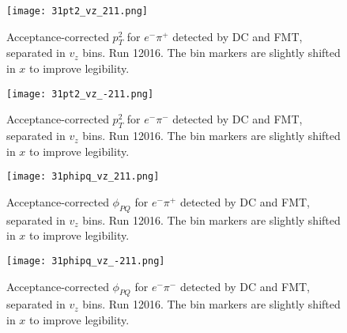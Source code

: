     \begin{figure}
        \centering
        \texttt{[image: 31pt2\_vz\_211.png]}
        \caption[Acceptance-corrected $p_T^2$ for $e^-\pi^+$ separated in $v_z$ bins]
        {Acceptance-corrected $p_T^2$ for $e^-\pi^+$ detected by DC and FMT, separated in $v_z$ bins.
        Run 12016.
        The bin markers are slightly shifted in $x$ to improve legibility.}
        \label{fig::14.31::pt2_211_vz}
    \end{figure}

    \begin{figure}
        \centering
        \texttt{[image: 31pt2\_vz\_-211.png]}
        \caption[Acceptance-corrected $p_T^2$ for $e^-\pi^-$ separated in $v_z$ bins]
        {Acceptance-corrected $p_T^2$ for $e^-\pi^-$ detected by DC and FMT, separated in $v_z$ bins.
        Run 12016.
        The bin markers are slightly shifted in $x$ to improve legibility.}
        \label{fig::14.31::pt2_-211_vz}
    \end{figure}

    \begin{figure}
        \centering
        \texttt{[image: 31phipq\_vz\_211.png]}
        \caption[Acceptance-corrected $\phi_{PQ}$ for $e^-\pi^+$ separated in $v_z$ bins]
        {Acceptance-corrected $\phi_{PQ}$ for $e^-\pi^+$ detected by DC and FMT, separated in $v_z$ bins.
        Run 12016.
        The bin markers are slightly shifted in $x$ to improve legibility.}
        \label{fig::14.31::phipq_211_vz}
    \end{figure}

    \begin{figure}
        \centering
        \texttt{[image: 31phipq\_vz\_-211.png]}
        \caption[Acceptance-corrected $\phi_{PQ}$ for $e^-\pi^-$ separated in $v_z$ bins]
        {Acceptance-corrected $\phi_{PQ}$ for $e^-\pi^-$ detected by DC and FMT, separated in $v_z$ bins.
        Run 12016.
        The bin markers are slightly shifted in $x$ to improve legibility.}
        \label{fig::14.31::phipq_-211_vz}
    \end{figure}

